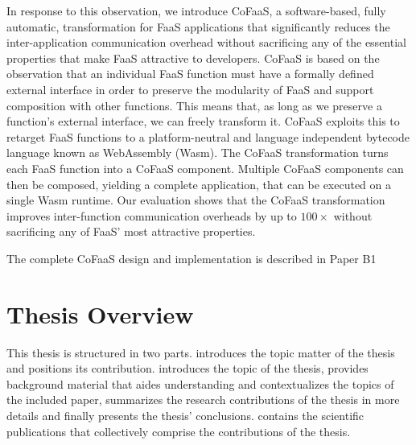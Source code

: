 \documentclass[../main.tex]{subfiles}
\begin{document}
\begin{refsection}
In response to this observation, we introduce CoFaaS, a
software-based, fully automatic, transformation for FaaS applications
that significantly reduces the inter-application communication
overhead without sacrificing any of the essential properties that make
FaaS attractive to developers. CoFaaS is based on the observation that
an individual FaaS function must have a formally defined external
interface in order to preserve the modularity of FaaS and support
composition with other functions. This means that, as long as we
preserve a function's external interface, we can freely transform
it. CoFaaS exploits this to retarget FaaS functions to a
platform-neutral and language independent bytecode language known as
WebAssembly (Wasm). The CoFaaS transformation turns each FaaS function
into a CoFaaS component. Multiple CoFaaS components can then be
composed, yielding a complete application, that can be executed on a
single Wasm runtime. Our evaluation shows that the CoFaaS
transformation improves inter-function communication overheads by up
to $100\times$ without sacrificing any of FaaS' most attractive properties.

The complete CoFaaS design and implementation is described in Paper B1~

\section{Thesis Overview}
This thesis is structured in two parts.  introduces the
topic matter of the thesis and positions its
contribution.  introduces the topic of the thesis,
 provides background material that aides
understanding and contextualizes the topics of the included paper,
 summarizes the research contributions of the
thesis in more details and finally  presents
the thesis' conclusions.  contains the scientific
publications that collectively comprise the contributions of the
thesis.

\ifx\chapincluded\undefined
  \printbibliography
  \end{refsection}
 \fi
\end{document}
